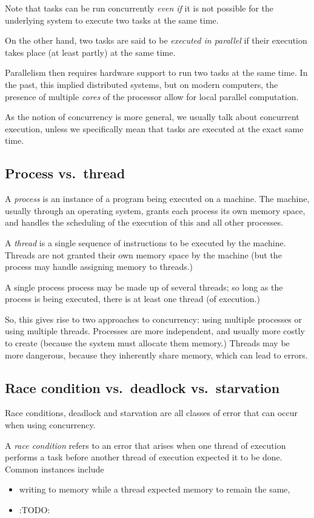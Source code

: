 \documentclass[11pt]{article}
\begin{document}
Note that tasks can be run concurrently \emph{even if} it is not possible
for the underlying system to execute two tasks at the same time.

On the other hand, two tasks are said to be \emph{executed in parallel} if
their execution takes place (at least partly) at the same time.

Parallelism then requires hardware support
to run two tasks at the same time.
In the past, this implied distributed systems, but on modern computers,
the presence of multiple \emph{cores} of the processor allow for
local parallel computation.

As the notion of concurrency is more general,
we usually talk about concurrent execution,
unless we specifically mean that tasks are executed at
the exact same time.

\subsection{Process vs. thread}
\label{sec:orgc7c9911}
A \emph{process} is an instance of a program being executed on a machine.
The machine, usually through an operating system,
grants each process its own memory space, and
handles the scheduling of the execution of this and all other processes.

A \emph{thread} is a single sequence of instructions to be executed
by the machine. Threads are not granted their own memory space
by the machine (but the process may handle assigning memory to threads.)

A single process process may be made up of several threads;
so long as the process is being executed, there is at least
one thread (of execution.)

So, this gives rise to two approaches to concurrency:
using multiple processes or using multiple threads.
Processes are more independent, and usually more costly to create
(because the system must allocate them memory.)
Threads may be more dangerous, because they inherently share
memory, which can lead to errors.

\subsection{Race condition vs. deadlock vs. starvation}
\label{sec:orgaabfa72}
Race conditions, deadlock and starvation are all classes of error
that can occur when using concurrency.

A \emph{race condition} refers to an error that arises when
one thread of execution performs a task
before another thread of execution expected it to be done.
Common instances include
\begin{itemize}
\item writing to memory while a thread expected memory
to remain the same,
\item :TODO:
\end{itemize}
\end{document}

